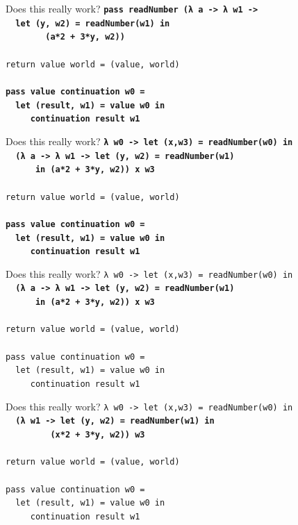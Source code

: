 \documentclass{beamer}
\begin{document}
\begin{frame}{Does this really work?}
  \texttt{\textbf{pass readNumber (λ a -> λ w1 ->\\
      \ \ let (y, w2) = readNumber(w1) in\\
      \ \ \ \ \ \ \ \ (a*2 + 3*y, w2))}\\
    \ \\
    return value world = (value, world) \\
    \ \\
    \textbf{pass value continuation w0 = \\
      \ \ let (result, w1) = value w0 in \\
      \ \ \ \ \ continuation result w1}
  }
\end{frame}

\begin{frame}{Does this really work?}
  \texttt{\textbf{λ w0 -> let (x,w3) = readNumber(w0) in\\
      \ \ (λ a -> λ w1 -> let (y, w2) = readNumber(w1) \\
      \ \ \ \ \ \ in (a*2 + 3*y, w2)) x w3}\\
    \ \\
    return value world = (value, world) \\
    \ \\
    \textbf{pass value continuation w0 = \\
      \ \ let (result, w1) = value w0 in \\
      \ \ \ \ \ continuation result w1}
  }
\end{frame}

\begin{frame}{Does this really work?}
  \texttt{λ w0 -> let (x,w3) = readNumber(w0) in\\
    \ \ \textbf{(λ a -> λ w1 -> let (y, w2) = readNumber(w1)\\
      \ \ \ \ \ \ in (a*2 + 3*y, w2)) x w3}\\
    \ \\
    return value world = (value, world) \\
    \ \\
    pass value continuation w0 = \\
    \ \ let (result, w1) = value w0 in \\
    \ \ \ \ \ continuation result w1
  }
\end{frame}

\begin{frame}{Does this really work?}
  \texttt{λ w0 -> let (x,w3) = readNumber(w0) in\\
    \ \ \textbf{(λ w1 -> let (y, w2) = readNumber(w1) in\\
      \ \ \ \ \ \ \ \ \ (x*2 + 3*y, w2)) w3}\\
    \ \\
    return value world = (value, world) \\
    \ \\
    pass value continuation w0 = \\
    \ \ let (result, w1) = value w0 in \\
    \ \ \ \ \ continuation result w1
  }
\end{frame}
\end{document}
